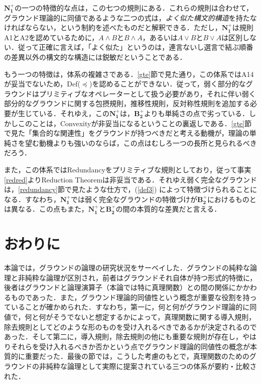 \documentclass[twoside,14Q,dvipdfmx]{jsarticle}
\theoremstyle{definition}
\begin{document}
$\mathbf{N_{1}^{+}}$の一つの特徴的な点は，この七つの規則にある．これらの規則は合わせて，グラウンド理論的に同値であるような二つの式は，\emph{よく似た構文的構造}を持たなければならない，という制約を述べたものだと解釈できる．ただし，$\mathbf{N_{1}^{+}}$は規則A1とA2を認めているために，$A\land B$と$B\land A$，あるいは$A\lor B$と$B\lor A$は区別しない．従って正確に言えば，「よく似た」というのは，連言ないし選言で結ぶ順番の差異以外の構文的な構造には鋭敏だということである．

もう一つの特徴は，体系の複雑さである．\ref{gte}節で見た通り，この体系ではA14が妥当でないため，Def($\preceq$)を認めることができない．従って，弱く部分的なグラウンドはプリミティブなオペレーターとして扱う必要があり，それに伴い弱く部分的なグラウンドに関する包摂規則，推移性規則，反対称性規則を追加する必要が生じている．それゆえ，この$\mathbf{N_{1}^{+}}$は，$\mathbf{B_{2}^{+}}$よりも単純さの点で劣っている．しかしこのことは，Convexityが非妥当になるということの裏返しである．\ref{gte}節で見た「集合的な関連性」をグラウンドが持つべきだと考える動機が，理論の単純さを望む動機よりも強いのならば，この点はむしろ一つの長所と見られるべきだろう．

また，この体系ではRedundancyをプリミティブな規則としており，従って事実\ref{redred}よりReduction Theoremは非妥当である．それゆえ弱く完全なグラウンドは，\ref{redundancy}節で見たような仕方で，(\ref{def3}) によって特徴づけられることになる．すなわち，$\mathbf{N_{1}^{+}}$では弱く完全なグラウンドの特徴づけが$\mathbf{B_{2}^{+}}$におけるものとは異なる．この点もまた，$\mathbf{N_{1}^{+}}$と$\mathbf{B_{2}^{+}}$の間の本質的な差異だと言える．
%
%
%
\section{おわりに}
本論では，グラウンドの論理の研究状況をサーベイした．グラウンドの純粋な論理と非純粋な論理が区別され，前者はグラウンドそれ自体が持つ形式的特徴に，後者はグラウンドと論理演算子（本論では特に真理関数）との間の関係にかかわるものであった．また，グラウンド理論的同値性という概念が重要な役割を持っていることが確かめられた．すなわち，第一に，何と何がグラウンド理論的に同値で，何と何がそうでないと想定するかによって，真理関数に関する導入規則，除去規則としてどのような形のものを受け入れるべきであるかが決定されるのであった．そして第二に，導入規則，除去規則の他にも重要な規則が存在し，やはりそれらを受け入れるべきか否かという点でグラウンド理論的同値性の概念が本質的に重要だった．最後の節では，こうした考慮のもとで，真理関数のためのグラウンドの非純粋な論理として実際に提案されている三つの体系が要約・比較された．
\end{document}
